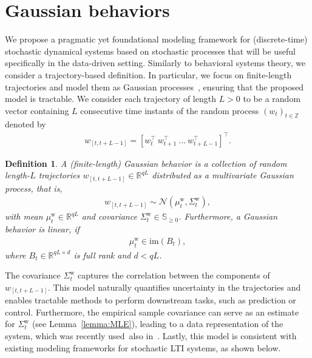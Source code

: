 \documentclass[letterpaper, 10 pt, conference]{ieeeconf}
\def\mw{\mu^\mathrm{w}_t}
\def\Sw{\Sigma^\mathrm{w}}
\newtheorem{definition}{Definition}
\begin{document}
\section{Gaussian behaviors} \label{sec:Gaussian_behaviors}
We propose a pragmatic yet foundational modeling framework for (discrete-time) stochastic dynamical systems based on stochastic processes that will be useful specifically in the data-driven setting.
Similarly to behavioral systems theory, we consider a trajectory-based definition.
In particular, we focus on finite-length trajectories and model them as Gaussian processes~\cite{doob1953stochastic,williams2006gaussian}, ensuring that the proposed model is tractable.
We consider each trajectory of length $L>0$ to be a random vector containing $L$ consecutive time instants of the random process $(w_t)_{t\in\mathbb{Z}}$ denoted by
\begin{align*}
    w_{[t,t+L-1]} = [w_{t}^\top~w_{t+1}^\top~\dots~w_{t+L-1}^\top]^\top.
\end{align*}


\begin{definition} \label{def:cov_model}
A \textit{(finite-length) Gaussian behavior} is a collection of random length-$L$ trajectories $w_{[t,t+L-1]}\in\mathbb{R}^{qL}$ distributed as a multivariate Gaussian process, that is,
\begin{align*}
    w_{[t,t+L-1]} \sim \mathcal{N}(\mw,\Sw_t), 
\end{align*}
with mean $\mw\in\mathbb{R}^{qL}$ and covariance $\Sw_t\in\mathbb{S}_{\geq0}$.
Furthermore, a Gaussian behavior is \textit{linear}, if 
\begin{align}
\mw \in \mathrm{im}(B_t), \label{eq:linear}
\end{align}
where $B_t\in\mathbb{R}^{qL\times d}$ is full rank and $d<qL$.
\end{definition}


The covariance $\Sw_t$ captures the correlation between the components of $w_{[t,t+L-1]}$.
This model naturally quantifies uncertainty in the trajectories and enables tractable methods to perform downstream tasks, such as prediction or control.
Furthermore, the empirical sample covariance can serve as an estimate for $\Sw_t$ (see Lemma~\ref{lemma:MLE}), leading to a data representation of the system, which was recently used~also in~\cite{zhao2024data}.
Lastly, this model is consistent with existing modeling frameworks for stochastic \gls{LTI} systems, as shown below.
\end{document}
